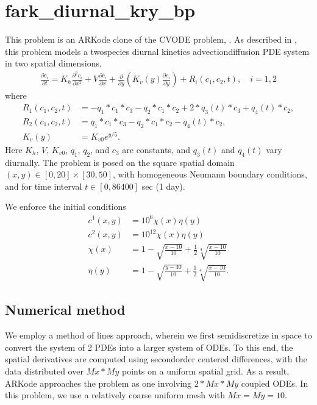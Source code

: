 \documentclass[letterpaper,10pt,english]{sphinxmanual}
\begin{document}
\section{fark\_diurnal\_kry\_bp}
\label{\detokenize{f2003_serial:fark-diurnal-kry-bp}}\label{\detokenize{f2003_serial:id1}}
\sphinxAtStartPar
This problem is an ARKode clone of the CVODE problem,
.  As described in , this problem
models a two\sphinxhyphen{}species diurnal kinetics advection\sphinxhyphen{}diffusion PDE system
in two spatial dimensions,
\begin{equation*}
\begin{split}\frac{\partial c_i}{\partial t} =
  K_h \frac{\partial^2 c_i}{\partial x^2} +
  V \frac{\partial     c_i}{\partial x} +
  \frac{\partial}{\partial y}\left( K_v(y)
  \frac{\partial c_i}{\partial y}\right) +
  R_i(c_1,c_2,t),\quad i=1,2\end{split}
\end{equation*}
\sphinxAtStartPar
where
\begin{equation*}
\begin{split}R_1(c_1,c_2,t) &= -q_1*c_1*c_3 - q_2*c_1*c_2 + 2*q_3(t)*c_3 + q_4(t)*c_2, \\
R_2(c_1,c_2,t) &=  q_1*c_1*c_3 - q_2*c_1*c_2 - q_4(t)*c_2, \\
K_v(y) &= K_{v0} e^{y/5}.\end{split}
\end{equation*}
\sphinxAtStartPar
Here \(K_h\), \(V\), \(K_{v0}\), \(q_1\), \(q_2\),
and \(c_3\) are constants, and \(q_3(t)\) and \(q_4(t)\)
vary diurnally.  The problem is posed on the square spatial domain
\((x,y) \in [0,20]\times[30,50]\), with homogeneous Neumann
boundary conditions, and for time interval \(t\in [0,86400]\) sec
(1 day).

\sphinxAtStartPar
We enforce the initial conditions
\begin{equation*}
\begin{split}c^1(x,y) &=  10^6 \chi(x)\eta(y) \\
c^2(x,y) &=  10^{12} \chi(x)\eta(y) \\
\chi(x) &= 1 - \sqrt{\frac{x - 10}{10}} + \frac12 \sqrt[4]{\frac{x - 10}{10}} \\
\eta(y) &= 1 - \sqrt{\frac{y - 40}{10}} + \frac12 \sqrt[4]{\frac{x - 10}{10}}.\end{split}
\end{equation*}

\subsection{Numerical method}
\label{\detokenize{f2003_serial:numerical-method}}
\sphinxAtStartPar
We employ a method of lines approach, wherein we first semi\sphinxhyphen{}discretize
in space to convert the system of 2 PDEs into a larger system of ODEs.
To this end, the spatial derivatives are computed using second\sphinxhyphen{}order
centered differences, with the data distributed over \(Mx*My\)
points on a uniform spatial grid.  As a result, ARKode approaches the
problem as one involving \(2*Mx*My\) coupled ODEs. In this
problem, we use a relatively coarse uniform mesh with
\(Mx=My=10\).
\end{document}
